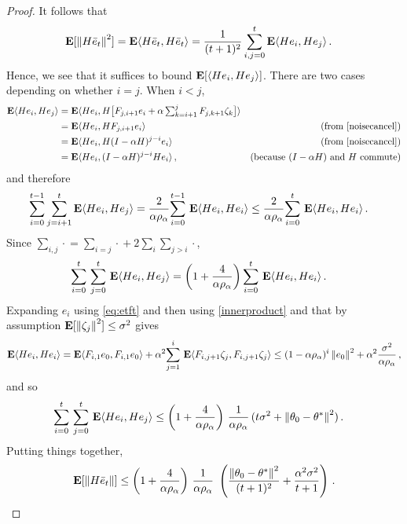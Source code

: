\begin{proof}
It follows that 
\begin{align*}
\E[\norm{H\eb_t}^2]&=\E\ip{H\eb_t,H\eb_t}
 =\frac{1}{(t+1)^2} \sum_{i,j=0}^t \E\ip{H e_i,He_j}\,.
\end{align*}
Hence, we see that it suffices to bound $\EE{\ip{H e_i, H e_j }}$.
There are two cases depending on whether $i=j$. When $i< j$,
\begin{align*}
\E\ip{He_i,He_j}
&=\E \ip{He_i,H\big[F_{j,i+1} e_i+\alpha\textstyle\sum_{k=i+1}^j F_{j,k+1}\zeta_{k}\big]}\\
&=\E\ip{He_i,H F_{j,i+1} e_i} & \text{(from \Cref{noisecancel})}\\
&=\E\ip{He_i,H (I-\alpha H)^{j-i} e_i} & \text{(from \Cref{noisecancel})}\\
&=\E\ip{He_i,(I-\alpha H)^{j-i}H e_i}\,, &\text{(because $(I-\alpha H)$ and $H$ commute)}
\end{align*}
and therefore
\begin{align*}
\label{inter}
\sum_{i=0}^{t-1}\sum_{j=i+1}^t \E\ip{ He_i,H e_j}
&=\frac2{\alpha\rho_{\alpha}} \ous{\sum}{i=0}{t-1}\E\ip{He_i,H e_i}
\leq \frac2{\alpha\rho_{\alpha}}\ous{\sum}{i=0}{t}\E\ip{He_i,H e_i}\,.
\end{align*}
Since $\sum_{i,j}\cdot{} = \sum_{i=j}\cdot{} + 2 \sum_i \sum_{j>i} \cdot{}$,
\begin{align*}
\ous{\sum}{i=0}{t}\ous{\sum}{j=0}{t} \E\ip{He_i,He_j}&= \left(1+\frac4{\alpha\rho_{\alpha}}\right)\ous{\sum}{i=0}{t}\E\ip{He_i,He_i}\,.
\end{align*}
Expanding $e_i$ using \eqref{eq:etft} and then using \cref{innerproduct} and that by assumption $\EE{ \norm{\zeta_j}^2 } \le \sigma^2$ gives
\begin{align*}
\E\ip{He_i,He_i}=\E\ip{F_{i,1}e_0,F_{i,1}e_0}+\alpha^2\ous{\sum}{j=1}{i}\E\ip{ F_{i,j+1}\zeta_j, F_{i,j+1}\zeta_j}
\leq (1-\alpha\rho_{\alpha})^i\norm{e_0}^2+ \alpha^2\frac{\sigma^2}{\alpha \rho_\alpha}\,,
\end{align*}
and so
\begin{align*}
\ous{\sum}{i=0}{t}\ous{\sum}{j=0}{t} \E\ip{He_i,He_j}
&\leq \left(1+\frac4{\alpha\rho_{\alpha}}\right)\, \frac1{\alpha\rho_{\alpha}}\, (t\sigma^2+\norm{\theta_0-\ts}^2)\,.
\end{align*}
Putting things together,
\begin{align}
\E[\norm{H\eb_t}]
\leq \left(1+\frac4{\alpha\rho_{\alpha}}\right)\, \frac1{\alpha\rho_{\alpha}}\, \,
		\left(\frac{\norm{\theta_0-\ts}^2}{(t+1)^2}+ \frac{\alpha^2\sigma^2}{t+1} \right)\,.
\end{align}
\end{proof}


